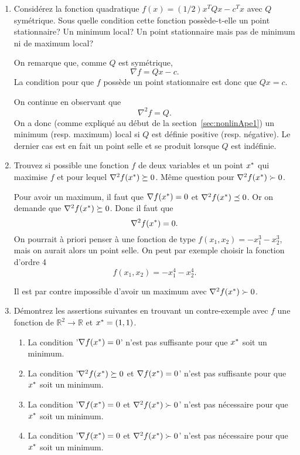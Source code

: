 \begin{enumerate}
\begin{enumerate}
        
          
  \end{enumerate}
  
  \item Considérez la fonction quadratique $f(x)=(1/2) x^T Q x-c^T x$ 
  avec $Q$ symétrique. Sous quelle condition cette fonction possède-t-elle un
    point stationnaire? 
    Un minimum local? 
    Un point stationnaire mais pas de minimum ni de maximum local?

    \begin{solution}
      On remarque que, comme $Q$ est symétrique,
      \[\nabla f = Qx - c.\]
      La condition pour que $f$ possède un point stationnaire
      est donc que $Qx = c$.
      
      On continue en observant que 
      \[\nabla^2 f = Q.\]
      On a donc (comme expliqué au début de la section~\ref{sec:nonlinApe1})
      un minimum (resp. maximum) local si $Q$ est définie positive (resp. négative).
      Le dernier cas est en fait un point selle
      et se produit lorsque $Q$ est indéfinie.
    \end{solution}
  
  \item Trouvez si possible une fonction $f$ de deux variables 
  et un point $x^*$ qui maximise $f$ 
  et pour lequel $\nabla^2 f(x^*) \succeq 0$. 
  Même question pour $\nabla^2 f(x^*) \succ 0$.

    \begin{solution}
      Pour avoir un maximum, il faut que $\nabla f(x^*) = 0$ 
      et $\nabla^2 f(x^*) \preceq 0$.
      Or on demande que $\nabla^2 f(x^*) \succeq 0$.
      Donc il faut que
      \[\nabla^2 f(x^*) = 0.\]
      On pourrait à priori penser à une fonction de type $f(x_1,x_2) = -x_1^3-x_2^3$,
      mais on aurait alors un point selle.
      On peut par exemple choisir la fonction d'ordre 4
      \[f(x_1,x_2) = -x_1^4-x_2^4.\]
      
      Il est par contre impossible d'avoir un maximum 
      avec $\nabla^2 f(x^*) \succ 0$.
    \end{solution}
  
  \item Démontrez les assertions suivantes en trouvant un contre-exemple
  avec $f$ une fonction de $\mathbb{R}^2 \rightarrow \mathbb{R}$
  et $x^* = (1,1)$.
  \begin{enumerate}
    \item La condition '$\nabla f(x^*)=0$' 
    n'est pas suffisante pour que $x^*$ soit un minimum.
    \item La condition '$\nabla^2 f(x^*)\succeq 0$ et $\nabla f(x^*)=0$'
    n'est pas suffisante pour que $x^*$ soit un minimum.
    \item La condition '$\nabla f(x^*) = 0$ et $\nabla^2 f(x^*)\succ 0$' 
    n'est pas nécessaire pour que $x^*$ soit un minimum.  
    \item La condition '$\nabla f(x^*)=0$ et $\nabla^2 f(x^*) \succ 0$' 
    n'est pas nécessaire pour que $x^*$ soit un minimum.
  \end{enumerate}
  

\end{enumerate}
